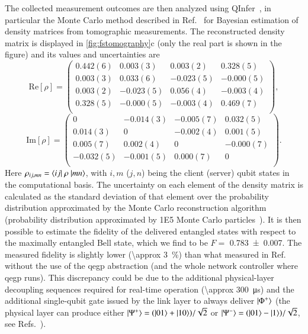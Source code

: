 The collected measurement outcomes are then analyzed using QInfer~\cite{granade_2017_qinfer}, in
particular the Monte Carlo method described in Ref.~\cite{granade_2016_practical} for Bayesian
estimation of density matrices from tomographic measurements. The reconstructed density matrix is
displayed in \cref{fig:fstomography}c (only the real part is shown in the figure) and its values and
uncertainties are
%
\begin{equation*}
    \mathrm{Re}[\rho] = \begin{pmatrix}
        0.442(6) & 0.003(3)  & 0.003(2)  & 0.328(5)  \\
        0.003(3) & 0.033(6)  & -0.023(5) & -0.000(5) \\
        0.003(2) & -0.023(5) & 0.056(4)  & -0.003(4) \\
        0.328(5) & -0.000(5) & -0.003(4) & 0.469(7)  \\
    \end{pmatrix},
\end{equation*}
%
\begin{equation*}
    \mathrm{Im}[\rho] = \begin{pmatrix}
        0         & -0.014(3) & -0.005(7) & 0.032(5)  \\
        0.014(3)  & 0         & -0.002(4) & 0.001(5)  \\
        0.005(7)  & 0.002(4)  & 0         & -0.000(7) \\
        -0.032(5) & -0.001(5) & 0.000(7)  & 0         \\
    \end{pmatrix}.
\end{equation*}
Here $\rho_{ij, mn} = \braket{ij|\ \rho\ |mn}$, with $i,m$ ($j,n$) being the client (server) qubit
states in the computational basis. The uncertainty on each element of the density matrix is
calculated as the standard deviation of that element over the probability distribution approximated
by the Monte Carlo reconstruction algorithm (probability distribution approximated by \num{1E5}
Monte Carlo particles~\cite{granade_2016_practical}). It is then possible to estimate the fidelity
of the delivered entangled states with respect to the maximally entangled Bell state, which we find
to be $F =$ \num{0.783(7)}. The measured fidelity is slightly lower (\qty{\approx 3}{\percent}) than
what measured in Ref.~\cite{pompili_2021_multinode} without the use of the \acrshort{qegp}
abstraction (and the whole network controller where \acrshort{qegp} runs). This discrepancy could be
due to the additional physical-layer decoupling sequences required for real-time operation
(\qty{\approx 300}{\us}) and the additional single-qubit gate issued by the link layer to always
deliver $\ket{\Phi^+}$ (the physical layer can produce either $\ket{\Psi^+} = (\ket{01} +
    \ket{10})/\sqrt{2}$ or $\ket{\Psi^-} = (\ket{01} - \ket{1})/ \sqrt{2}$, see
Refs.~\cite{humphreys_2018_delivery, pompili_2021_multinode}).

